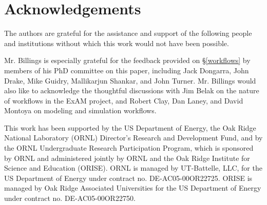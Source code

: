 \section{Acknowledgements} The authors are grateful for the assistance and
support of the following people and institutions without which this work would
not have been possible.

Mr. Billings is especially grateful for the feedback provided on
\S\ref{workflows} by members of his PhD committee on this
paper, including Jack Dongarra, John Drake, Mike Guidry, Mallikarjun Shankar, and John Turner. Mr.
Billings would also like to acknowledge the thoughtful discussions with Jim
Belak on the nature of workflows in the ExAM project, and Robert Clay, Dan
Laney, and David Montoya on modeling and simulation workflows.

This work has been supported by the US Department of Energy, the Oak Ridge National Laboratory (ORNL) Director's Research and Development Fund, and by the ORNL
Undergraduate Research Participation Program, which is sponsored by ORNL and
administered jointly by ORNL and the Oak Ridge Institute for Science and
Education (ORISE). ORNL is managed by UT-Battelle, LLC, for the US Department
of Energy under contract no. DE-AC05-00OR22725. ORISE is managed by Oak Ridge
Associated Universities for the US Department of Energy under contract no.
DE-AC05-00OR22750.
